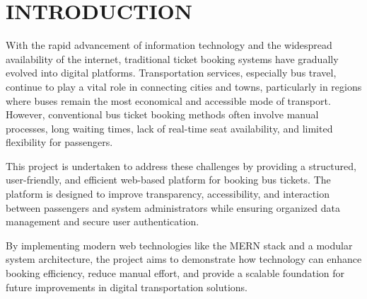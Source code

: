 \chapter{INTRODUCTION}

With the rapid advancement of information technology and the widespread availability of the internet, traditional ticket booking systems have gradually evolved into digital platforms. Transportation services, especially bus travel, continue to play a vital role in connecting cities and towns, particularly in regions where buses remain the most economical and accessible mode of transport. However, conventional bus ticket booking methods often involve manual processes, long waiting times, lack of real-time seat availability, and limited flexibility for passengers.

This project is undertaken to address these challenges by providing a structured, user-friendly, and efficient web-based platform for booking bus tickets. The platform is designed to improve transparency, accessibility, and interaction between passengers and system administrators while ensuring organized data management and secure user authentication. 

By implementing modern web technologies like the MERN stack and a modular system architecture, the project aims to demonstrate how technology can enhance booking efficiency, reduce manual effort, and provide a scalable foundation for future improvements in digital transportation solutions.
